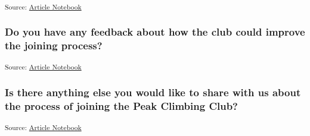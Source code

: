 \documentclass[
  letterpaper,
  DIV=11,
  numbers=noendperiod]{scrartcl}
\begin{document}
\textsubscript{Source:
\href{https://slackline.github.io/pcc-new-member-survey/index.qmd.html}{Article
Notebook}}

\subsubsection{Do you have any feedback about how the club could improve
the joining
process?}\label{do-you-have-any-feedback-about-how-the-club-could-improve-the-joining-process}

\textsubscript{Source:
\href{https://slackline.github.io/pcc-new-member-survey/index.qmd.html}{Article
Notebook}}

\subsubsection{Is there anything else you would like to share with us
about the process of joining the Peak Climbing
Club?}\label{is-there-anything-else-you-would-like-to-share-with-us-about-the-process-of-joining-the-peak-climbing-club}

\textsubscript{Source:
\href{https://slackline.github.io/pcc-new-member-survey/index.qmd.html}{Article
Notebook}}
\end{document}
